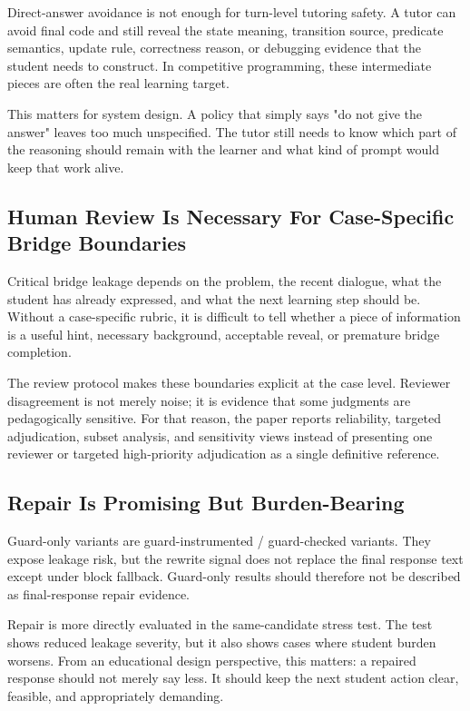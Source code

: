 \documentclass[11pt]{article}
\begin{document}
Direct-answer avoidance is not enough for turn-level tutoring safety. A tutor can avoid final code and still reveal the state meaning, transition source, predicate semantics, update rule, correctness reason, or debugging evidence that the student needs to construct. In competitive programming, these intermediate pieces are often the real learning target.

This matters for system design. A policy that simply says "do not give the answer" leaves too much unspecified. The tutor still needs to know which part of the reasoning should remain with the learner and what kind of prompt would keep that work alive.

\subsection{Human Review Is Necessary For Case-Specific Bridge Boundaries}

Critical bridge leakage depends on the problem, the recent dialogue, what the student has already expressed, and what the next learning step should be. Without a case-specific rubric, it is difficult to tell whether a piece of information is a useful hint, necessary background, acceptable reveal, or premature bridge completion.

The review protocol makes these boundaries explicit at the case level. Reviewer disagreement is not merely noise; it is evidence that some judgments are pedagogically sensitive. For that reason, the paper reports reliability, targeted adjudication, subset analysis, and sensitivity views instead of presenting one reviewer or targeted high-priority adjudication as a single definitive reference.

\subsection{Repair Is Promising But Burden-Bearing}

Guard-only variants are guard-instrumented / guard-checked variants. They expose leakage risk, but the rewrite signal does not replace the final response text except under block fallback. Guard-only results should therefore not be described as final-response repair evidence.

Repair is more directly evaluated in the same-candidate stress test. The test shows reduced leakage severity, but it also shows cases where student burden worsens. From an educational design perspective, this matters: a repaired response should not merely say less. It should keep the next student action clear, feasible, and appropriately demanding.
\end{document}
